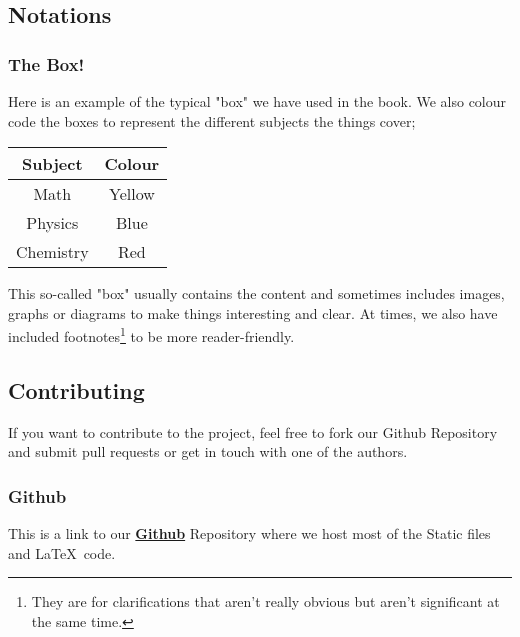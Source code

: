 \subsection{Notations}
\subsubsection{The Box!}
Here is an example of the typical "box" we have used in the book. We also colour code the boxes to represent the different subjects the things cover;
\begin{center}
\begin{tabular}{|c|c|}
\hline
Subject & Colour\\
\hline
Math & Yellow\\
Physics & Blue\\
Chemistry & Red\\
\hline
\end{tabular}
\end{center}
\begin{guidebox}{}
{This so-called "box" usually contains the content and sometimes includes images, graphs or diagrams to make things interesting and clear. At times, we also have included footnotes\footnote{They are for clarifications that aren't really obvious but aren't significant at the same time.} to be more reader-friendly.}
\end{guidebox}
\subsection{Contributing}
If you want to contribute to the project, feel free to fork our Github Repository and submit pull requests or get in touch with one of the authors.
\subsubsection{Github}
This is a link to our \textbf{\href{https://github.com/Psi25Omega/Thonk-M-P-C}{Github}} Repository where we host most of the Static files and \LaTeX~code. 
\newpage

